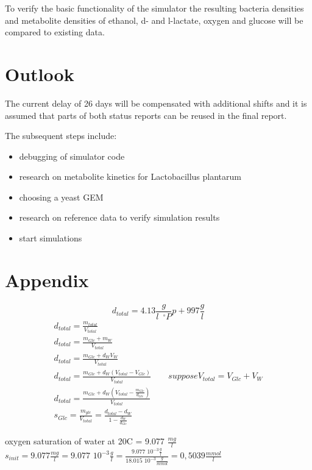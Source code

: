 \documentclass[a4paper,10pt]{article}
\begin{document}
To verify the basic functionality of the simulator the resulting bacteria densities and metabolite densities of ethanol, d- and l-lactate,
oxygen and glucose will be compared to existing data.

\section{Outlook}

The current delay of 26 days will be compensated with additional shifts and it is assumed that parts of both status reports can be reused
in the final report.

\vspace{0.5cm}
The subsequent steps include:
\begin{itemize}
 \item debugging of simulator code
 \item research on metabolite kinetics for Lactobacillus plantarum
 \item choosing a yeast GEM
 \item research on reference data to verify simulation results
 \item start simulations
\end{itemize}




\newpage

\printbibliography

\section{Appendix}

\begin{equation}
 d_{total} = 4.13 \frac{g}{l \,\,\, ^\circ P} p + 997 \frac{g}{l}
\end{equation}
\begin{align}
 d_{total} = \frac{m_{total}}{V_{total}}\\
 d_{total} = \frac{m_{Glc} + m_W}{V_{total}}\\
 d_{total} = \frac{m_{Glc} + d_W V_W}{V_{total}}\\
 d_{total} = \frac{m_{Glc} + d_W \left(V_{total} - V_{Glc}\right)}{V_{total}} \qquad suppose V_{total} = V_{Glc} + V_W\\
 d_{total} = \frac{m_{Glc} + d_W \left(V_{total} - \frac{m_{Glc}}{d_{Glc}}\right)}{V_{total}}\\
 s_{Glc} = \frac{m_{glc}}{V_{total}} = \frac{d_{total} - d_W}{1 - \frac{d_W}{d_{Glc}}}
\end{align}

oxygen saturation of water at 20\textdegree C = 9.077 $\frac{mg}{l}$ \cite{fao_water_1987}
$s_{init} = 9.077 \frac{mg}{l} = 9.077 \,\, 10^{-3}  \frac{g}{l} = \frac{9.077 \,\, 10^{-3} \frac{g}{l}}{18.015 \,\, 10^{-3} \frac{g}{mmol}} = 0,5039 \frac{mmol}{l}$
\end{document}
